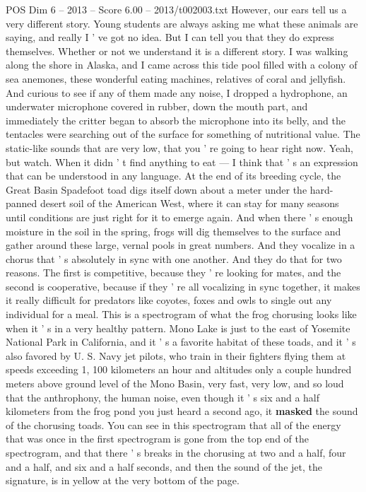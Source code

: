 \begin{textsample}{POS Dim 6 – 2013 – Score 6.00 – 2013/t002003.txt}
However, our ears tell us a very different story.
Young students are always asking me what these animals are saying, and really I ' ve got no idea.
But I can tell you that they do express themselves.
Whether or not we understand it is a different story.
I was walking along the shore in Alaska, and I came across this tide pool filled with a colony of sea anemones, these wonderful eating machines, relatives of coral and jellyfish.
And curious to see if any of them made any noise, I dropped a hydrophone, an underwater microphone covered in rubber, down the mouth part, and immediately the critter began to absorb the microphone into its belly, and the tentacles were searching out of the surface for something of nutritional value.
The static-like sounds that are very low, that you ' re going to hear right now.
Yeah, but watch.
When it didn ' t find anything to eat — I think that ' s an expression that can be understood in any language.
At the end of its breeding cycle, the Great Basin Spadefoot toad digs itself down about a meter under the hard-panned desert soil of the American West, where it can stay for many seasons until conditions are just right for it to emerge again.
And when there ' s enough moisture in the soil in the spring, frogs will dig themselves to the surface and gather around these large, vernal pools in great numbers.
And they vocalize in a chorus that ' s absolutely in sync with one another.
And they do that for two reasons.
The first is competitive, because they ' re looking for mates, and the second is cooperative, because if they ' re all vocalizing in sync together, it makes it really difficult for predators like coyotes, foxes and owls to single out any individual for a meal.
This is a spectrogram of what the frog chorusing looks like when it ' s in a very healthy pattern.
Mono Lake is just to the east of Yosemite National Park in California, and it ' s a favorite habitat of these toads, and it ' s also favored by U.
S.
Navy jet pilots, who train in their fighters flying them at speeds exceeding 1, 100 kilometers an hour and altitudes only a couple hundred meters above ground level of the Mono Basin, very fast, very low, and so loud that the anthrophony, the human noise, even though it ' s six and a half kilometers from the frog pond you just heard a second ago, it \textbf{masked} the sound of the chorusing toads.
You can see in this spectrogram that all of the energy that was once in the first spectrogram is gone from the top end of the spectrogram, and that there ' s breaks in the chorusing at two and a half, four and a half, and six and a half seconds, and then the sound of the jet, the signature, is in yellow at the very bottom of the page.

\end{textsample}
